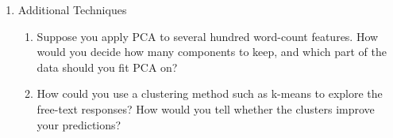 \documentclass[12pt]{article}
\begin{document}
\begin{enumerate}
\begin{enumerate}

\item Suppose one class makes up 60\% of the training set. What accuracy does a model that always predicts this class achieve? Which metric would reveal that this model is useless?

\item How do you compute precision, recall, and F1 for a 3-class problem? What is the difference between macro-averaging and weighted averaging, and when would you prefer each one?

\end{enumerate}

\item Additional Techniques

\begin{enumerate}

\item Suppose you apply PCA to several hundred word-count features. How would you decide how many components to keep, and which part of the data should you fit PCA on?

\item How could you use a clustering method such as k-means to explore the free-text responses? How would you tell whether the clusters improve your predictions?

\end{enumerate}

\end{enumerate}
\end{document}
